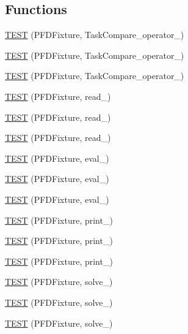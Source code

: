 \subsection*{Functions}
\begin{DoxyCompactItemize}
\item 
\hyperlink{TestPFD_8c_09_09_a5ed3fc0d0b63280d8dada6d0a850c9ea}{T\-E\-S\-T} (P\-F\-D\-Fixture, Task\-Compare\-\_\-operator\-\_)
\item 
\hyperlink{TestPFD_8c_09_09_a3c48a448bca7527b18ec0389a860d58f}{T\-E\-S\-T} (P\-F\-D\-Fixture, Task\-Compare\-\_\-operator\-\_)
\item 
\hyperlink{TestPFD_8c_09_09_aada73f49b8f894577cb2334ba37495a5}{T\-E\-S\-T} (P\-F\-D\-Fixture, Task\-Compare\-\_\-operator\-\_)
\item 
\hyperlink{TestPFD_8c_09_09_ae2ceeb6270e4c46f9184f444c9a18803}{T\-E\-S\-T} (P\-F\-D\-Fixture, read\-\_)
\item 
\hyperlink{TestPFD_8c_09_09_a7cbb6f2592992b1e2738ac30bd9b3179}{T\-E\-S\-T} (P\-F\-D\-Fixture, read\-\_)
\item 
\hyperlink{TestPFD_8c_09_09_ad4d893008beebcf263d3cc3d02700f98}{T\-E\-S\-T} (P\-F\-D\-Fixture, read\-\_)
\item 
\hyperlink{TestPFD_8c_09_09_a19c5ff94969bb3a46858e6bf9cbe1776}{T\-E\-S\-T} (P\-F\-D\-Fixture, eval\-\_)
\item 
\hyperlink{TestPFD_8c_09_09_ab68afb0eeb95c024738a36ae7ff8fc18}{T\-E\-S\-T} (P\-F\-D\-Fixture, eval\-\_)
\item 
\hyperlink{TestPFD_8c_09_09_a19d66a22f83e9ccf2132b01deaba1867}{T\-E\-S\-T} (P\-F\-D\-Fixture, eval\-\_)
\item 
\hyperlink{TestPFD_8c_09_09_aeb73c70e967605680ad0fd952404723a}{T\-E\-S\-T} (P\-F\-D\-Fixture, print\-\_)
\item 
\hyperlink{TestPFD_8c_09_09_a7f9a79749e850d18f5ce2dd840bcd811}{T\-E\-S\-T} (P\-F\-D\-Fixture, print\-\_)
\item 
\hyperlink{TestPFD_8c_09_09_a9e20949b00d611069dcdcdc5d2cb7f0d}{T\-E\-S\-T} (P\-F\-D\-Fixture, print\-\_)
\item 
\hyperlink{TestPFD_8c_09_09_aa23a55abbaab38d30093f05880927102}{T\-E\-S\-T} (P\-F\-D\-Fixture, solve\-\_)
\item 
\hyperlink{TestPFD_8c_09_09_a0bfee5bdfce5835ee3c258c88e61ccef}{T\-E\-S\-T} (P\-F\-D\-Fixture, solve\-\_)
\item 
\hyperlink{TestPFD_8c_09_09_ad8fe4b88c588f742bf125c129fa3d94f}{T\-E\-S\-T} (P\-F\-D\-Fixture, solve\-\_)
\end{DoxyCompactItemize}


